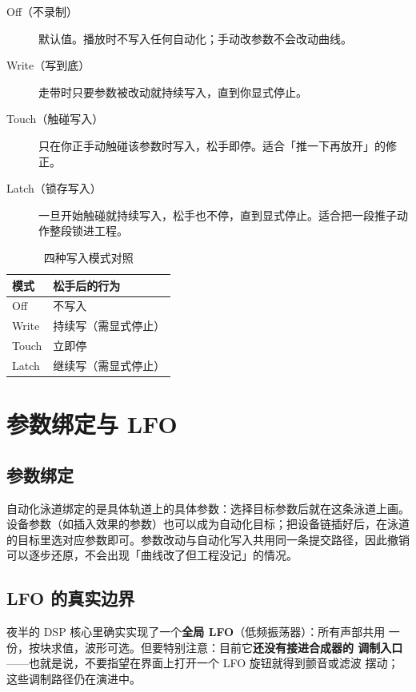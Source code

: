 \begin{description}
  \item[Off（不录制）] 默认值。播放时不写入任何自动化；手动改参数不会改动曲线。
  \item[Write（写到底）] 走带时只要参数被改动就持续写入，直到你显式停止。
  \item[Touch（触碰写入）] 只在你正手动触碰该参数时写入，松手即停。适合「推一下再放开」的修正。
  \item[Latch（锁存写入）] 一旦开始触碰就持续写入，松手也不停，直到显式停止。适合把一段推子动作整段锁进工程。
\end{description}

\begin{table}[htbp]
\centering
\caption{四种写入模式对照}
\label{tab:ch06-write-modes}
\begin{tabular}{ll}
\hline
模式 & 松手后的行为 \\
\hline
Off & 不写入 \\
Write & 持续写（需显式停止） \\
Touch & 立即停 \\
Latch & 继续写（需显式停止） \\
\hline
\end{tabular}
\end{table}

\section{参数绑定与 LFO}

\subsection{参数绑定}

自动化泳道绑定的是具体轨道上的具体参数：选择目标参数后就在这条泳道上画。
设备参数（如插入效果的参数）也可以成为自动化目标；把设备链插好后，在泳道
的目标里选对应参数即可。参数改动与自动化写入共用同一条提交路径，因此撤销
可以逐步还原，不会出现「曲线改了但工程没记」的情况。

\subsection{LFO 的真实边界}

夜半的 DSP 核心里确实实现了一个\textbf{全局 LFO}（低频振荡器）：所有声部共用
一份，按块求值，波形可选。但要特别注意：目前它\textbf{还没有接进合成器的
调制入口}——也就是说，不要指望在界面上打开一个 LFO 旋钮就得到颤音或滤波
摆动；这些调制路径仍在演进中。


